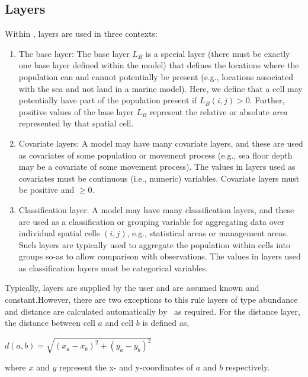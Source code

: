 \subsection{Layers}

Within \SPM, layers are used in three contexts:

\begin{enumerate}

\item The base layer: The base layer $L_B$ is a special layer (there must be exactly one base layer defined within the model) that defines the locations where the population can and cannot potentially be present (e.g., locations associated with the sea and not land in a marine model). Here, we define that a cell may potentially have part of the population present if $L_B(i,j) > 0$. Further, positive values of the base layer $L_B$ represent the relative or absolute \emph{area} represented by that spatial cell. 

\item Covariate layers: A model may have many covariate layers, and these are used as covariates of some population or movement process (e.g., sea floor depth may be a covariate of some movement process). The values in layers used as covariates must be continuous (i.e., numeric) variables. Covariate layers must be positive and $\geq 0$.

\item Classification layer. A model may have many classification layers, and these are used as a classification or grouping variable for aggregating data over individual spatial cells $(i,j)$, e.g., statistical areas or management areas. Such layers are typically used to aggregate the population within cells into groups so-as to allow comparison with observations. The values in layers used as classification layers must be categorical variables.

\end{enumerate}

Typically, layers are supplied by the user and are assumed known and constant.However, there are two exceptions to this rule \textemdash layers of type abundance and distance are calculated automatically by \SPM\ as required. For the distance layer, the distance between cell $a$ and cell $b$ is defined as,

$d(a,b)=\sqrt{(x_a-x_b)^2 +(y_a-y_b)^2}$

where $x$ and $y$ represent the x- and y-coordinates of $a$ and $b$ respectively.

